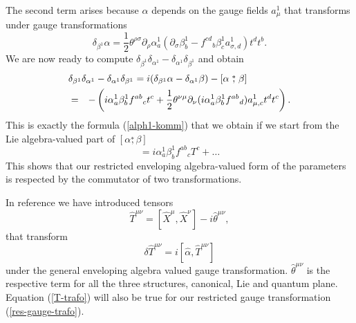 \documentclass[a4paper,11pt]{article}
\def\nn{\nonumber }
\def\ds{\stackrel{*}{,}}
\def\pat{\partial}
\begin{document}
The second term arises because $\alpha$ depends on the gauge fields $a^1_{\mu}$ that 
transforms under gauge transformations 
\begin{equation}
\label{delta-alpha}
  \delta_{\beta^1}\alpha=\frac{1}{2}\theta^{\rho\sigma}\pat_{\rho}\alpha^1_a(\pat_{\sigma}\beta^1_b-f^{cd}{}_{b}\beta^1_ca^1_{\sigma,d})t^dt^b.
\end{equation}
We are now ready to compute $\delta_{\beta^1}\delta_{\alpha^1}-\delta_{\alpha^1}\delta_{\beta^1}$ 
and obtain
\begin{eqnarray}
  \lefteqn{\delta_{\beta^1}\delta_{\alpha^1}-\delta_{\alpha^1}\delta_{\beta^1}=i(\delta_{\beta^1}\alpha-\delta_{\alpha^1}\beta)-[\alpha\ds\beta]}\nn\\
  &=& -\left(i\alpha_a^1\beta^1_bf^{ab}{}_ct^c+\frac{1}{2}\theta^{\nu\mu}\pat_{\nu}(i\alpha^1_a\beta^1_bf^{ab}{}_d)a^1_{\mu,c}t^dt^c\right).
\end{eqnarray}
This is exactly the formula (\ref{alph1-komm}) that we obtain if we start from 
the Lie algebra-valued part of $[\alpha\ds\beta]$
\begin{equation}
  [\alpha\ds\beta]=i\alpha^1_a\beta^1_bf^{ab}{}_cT^c+\ldots
\end{equation}
This shows that our restricted enveloping algebra-valued form of the parameters  
is respected by the commutator of two transformations.

In reference \cite{MSSW} we have introduced tensors
\begin{equation}
  \hat{T}^{\mu\nu}=[\hat{X}^{\mu},\hat{X}^{\nu}]-i\hat{\theta}^{\mu\nu},
\end{equation}
that transform
\begin{equation}
\label{T-trafo}
  \delta\hat{T}^{\mu\nu}=i[\hat{\alpha},\hat{T}^{\mu\nu}]
\end{equation}
under the general enveloping algebra valued gauge transformation. 
$\hat{\theta}^{\mu\nu}$ is the respective term for all the three structures, 
canonical, Lie and quantum plane. Equation (\ref{T-trafo}) will also be true for 
our restricted gauge transformation (\ref{res-gauge-trafo}). 
\end{document}
